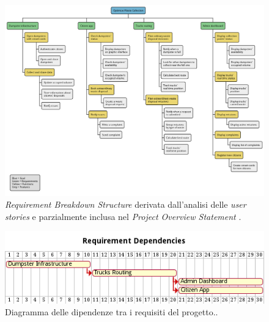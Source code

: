 \begin{figure}[H]
    \centering
    \includegraphics[width=\textwidth]{../img/requirement-breakdown-structure.pm}
    \caption{\textit{Requirement Breakdown Structure} derivata dall'analisi delle \textit{user stories} e parzialmente inclusa nel \textit{Project Overview Statement}  .}
    \label{fig:requirement-breakdown-structure}
\end{figure}

\begin{figure}[H]
    \centering
    \includegraphics[width=\textwidth]{../img/gantt-requirements-dependencies.pm}
    \caption{Diagramma delle dipendenze tra i requisiti del progetto..}
    \label{fig:gantt-requirements-dependencies}
\end{figure}

